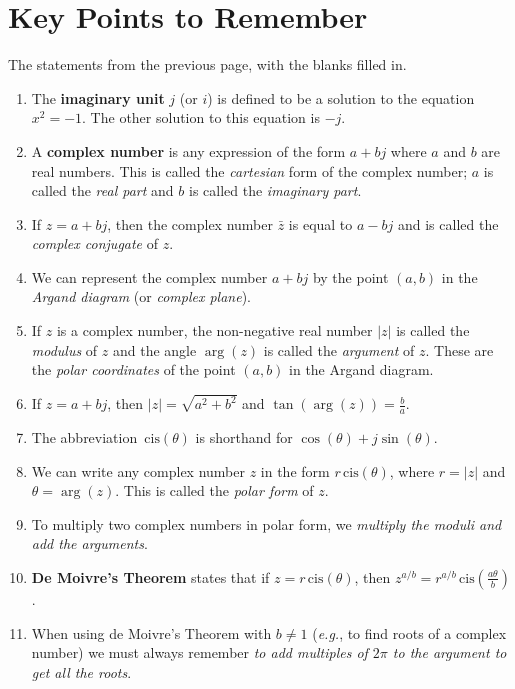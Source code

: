 \documentclass{article}
\newcommand{\cis}{\,\mathrm{cis}}
\begin{document}
\clearpage

\section{Key Points to Remember}

The statements from the previous page, with the blanks filled in.

\begin{enumerate}
\item The \textbf{imaginary unit} $j$ (or $i$) is defined to be a solution to the equation $x^2=-1$. The other solution to this equation is $-j$.
\item A \textbf{complex number} is any expression of the form $a+bj$ where $a$ and $b$ are real numbers. This is called the \textit{cartesian} form of the complex number; $a$ is called the \textit{real part} and $b$ is called the \textit{imaginary part}.
\item If $z=a+bj$, then the complex number $\bar{z}$ is equal to $a-bj$ and is called the \textit{complex conjugate} of $z$.
\item We can represent the complex number $a+bj$ by the point $(a,b)$ in the \textit{Argand diagram} (or \textit{complex plane}).
\item If $z$ is a complex number, the non-negative real number $|z|$ is called the \textit{modulus} of $z$ and the angle $\arg(z)$ is called the \textit{argument} of $z$. These are the \textit{polar coordinates} of the point $(a,b)$ in the Argand diagram.
\item If $z=a+bj$, then $|z|=\sqrt{a^2+b^2}$ and $\tan(\arg(z))=\frac{b}{a}$.
\item The abbreviation $\cis(\theta)$ is shorthand for $\cos(\theta)+j\sin(\theta)$.
\item We can write any complex number $z$ in the form $r\cis(\theta)$, where $r=|z|$ and $\theta=\arg(z)$. This is called the \textit{polar form} of $z$.
\item To multiply two complex numbers in polar form, we \textit{multiply the moduli and add the arguments}.
\item \textbf{De Moivre's Theorem} states that if $z=r\cis(\theta)$, then $z^{a/b}=r^{a/b}\cis\left(\frac{a\theta}{b}\right)$.
\item When using de Moivre's Theorem with $b\neq 1$ (\textit{e.g.}, to find roots of a complex number) we must always remember \textit{to add multiples of $2\pi$ to the argument to get all the roots}.
\end{enumerate}
\end{document}
